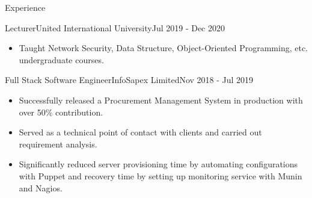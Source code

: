 \documentclass[]{mcdowellcv}
\begin{document}
\begin{cvsection}{Experience}
		\begin{cvsubsection}{Lecturer}{United International University}{Jul 2019 - Dec 2020}
			\begin{itemize}
				\item Taught Network Security, Data Structure, Object-Oriented Programming, etc. undergraduate courses.
			\end{itemize}
		\end{cvsubsection}
		
		\begin{cvsubsection}{Full Stack Software Engineer}{InfoSapex Limited}{Nov 2018 - Jul 2019}
			\begin{itemize}
				\item Successfully released a Procurement Management System in production with over 50\% contribution.
				\item Served as a technical point of contact with clients and carried out requirement analysis.
				\item Significantly reduced server provisioning time by automating configurations with Puppet and recovery time by setting up monitoring service with Munin and Nagios.
			\end{itemize}
		\end{cvsubsection}
		
	\end{cvsection}
\end{document}
